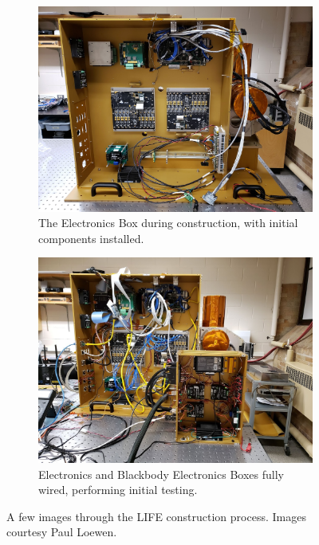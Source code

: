 \begin{figure}
\begin{subfigure}[h]{0.4\textwidth}
    \end{subfigure}
    \begin{subfigure}[h]{0.4\textwidth}
        \centering
        \includegraphics[width=\textwidth]{chap3_images/ebox_during_construction.jpg}
        \caption{The Electronics Box during construction, with initial components installed.}
        \label{fig:Ebox_during_construction}
    \end{subfigure}
    \begin{subfigure}[h]{0.6\textwidth}
        \centering
        \includegraphics[width=\textwidth]{chap3_images/electronics_boxes_initial_boot.jpg}
        \caption{Electronics and Blackbody Electronics Boxes fully wired, performing initial testing.}
        \label{fig:Ebox_fully_wired}
    \end{subfigure}
    \caption{A few images through the LIFE construction process. Images courtesy Paul Loewen.}
    \label{LIFE_construction}
\end{figure}

